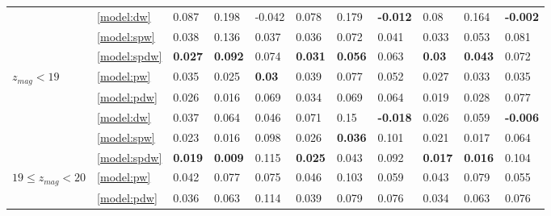 \documentclass[fleqn,usenatbib]{mnras}
\begin{document}
\begin{table}
\begin{tabular}{lllllllllll}
                              & \ref{model:dw} &                0.087 &           0.198 &           -0.042 &            0.078 &           0.179 &  \textbf{-0.012} &             0.08 &           0.164 &  \textbf{-0.002} \\
                              & \ref{model:spw} &                0.038 &           0.136 &            0.037 &            0.036 &           0.072 &            0.041 &            0.033 &           0.053 &            0.081 \\
                              & \ref{model:spdw} &       \textbf{0.027} &  \textbf{0.092} &            0.074 &   \textbf{0.031} &  \textbf{0.056} &            0.063 &    \textbf{0.03} &  \textbf{0.043} &            0.072 \\
\hline
            \hline
            $z_{mag} < 19$ & \ref{model:pw} &                0.035 &           0.025 &    \textbf{0.03} &            0.039 &           0.077 &            0.052 &            0.027 &           0.033 &            0.035 \\
                                   & \ref{model:pdw} &                0.026 &           0.016 &            0.069 &            0.034 &           0.069 &            0.064 &            0.019 &           0.028 &            0.077 \\
                                   & \ref{model:dw} &                0.037 &           0.064 &            0.046 &            0.071 &            0.15 &  \textbf{-0.018} &            0.026 &           0.059 &  \textbf{-0.006} \\
                                   & \ref{model:spw} &                0.023 &           0.016 &            0.098 &            0.026 &  \textbf{0.036} &            0.101 &            0.021 &           0.017 &            0.064 \\
                                   & \ref{model:spdw} &       \textbf{0.019} &  \textbf{0.009} &            0.115 &   \textbf{0.025} &           0.043 &            0.092 &   \textbf{0.017} &  \textbf{0.016} &            0.104 \\
\hline
            $19 \leq z_{mag} < 20$ & \ref{model:pw} &                0.042 &           0.077 &            0.075 &            0.046 &           0.103 &            0.059 &            0.043 &           0.079 &            0.055 \\
                                   & \ref{model:pdw} &                0.036 &           0.063 &            0.114 &            0.039 &           0.079 &            0.076 &            0.034 &           0.063 &            0.076 \\

\end{tabular}
\end{table}
\end{document}

